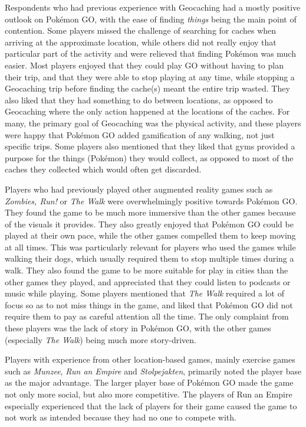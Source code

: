 Respondents who had previous experience with Geocaching had a mostly positive outlook on Pokémon GO, with the ease of finding \emph{things} being the main point of contention. Some players missed the challenge of searching for caches when arriving at the approximate location, while others did not really enjoy that particular part of the activity and were relieved that finding Pokémon was much easier. Most players enjoyed that they could play GO without having to plan their trip, and that they were able to stop playing at any time, while stopping a Geocaching trip before finding the cache(s) meant the entire trip wasted. They also liked that they had something to do between locations, as opposed to Geocaching where the only action happened at the locations of the caches. For many, the primary goal of Geocaching was the physical activity, and these players were happy that Pokémon GO added gamification of any walking, not just specific trips. Some players also mentioned that they liked that gyms provided a purpose for the things (Pokémon) they would collect, as opposed to most of the caches they collected which would often get discarded.

Players who had previously played other augmented reality games such as \emph{Zombies, Run!} or \emph{The Walk} were overwhelmingly positive towards Pokémon GO. They found the game to be much more immersive than the other games because of the visuals it provides. They also greatly enjoyed that Pokémon GO could be played at their own pace, while the other games compelled them to keep moving at all times. This was particularly relevant for players who used the games while walking their dogs, which usually required them to stop multiple times during a walk. They also found the game to be more suitable for play in cities than the other games they played, and appreciated that they could listen to podcasts or music while playing. Some players mentioned that \emph{The Walk} required a lot of focus so as to not miss things in the game, and liked that Pokémon GO did not require them to pay as careful attention all the time. The only complaint from these players was the lack of story in Pokémon GO, with the other games (especially \emph{The Walk}) being much more story-driven. 

Players with experience from other location-based games, mainly exercise games such as \emph{Munzee}, \emph{Run an Empire} and \emph{Stolpejakten}, primarily noted the player base as the major advantage. The larger player base of Pokémon GO made the game not only more social, but also more competitive. The players of Run an Empire especially experienced that the lack of players for their game caused the game to not work as intended because they had no one to compete with.

